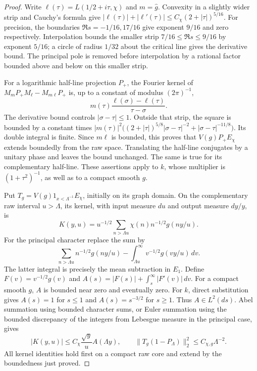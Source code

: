 \begin{proof}
Write $\ell(\tau)=L(1/2+i\tau,\chi)$ and $m=\widehat g$.
Convexity in a slightly wider strip and Cauchy's formula give
$|\ell(\tau)|+|\ell'(\tau)|\leq C_\chi(2+|\tau|)^{5/16}$.
For precision, the boundaries $\Re s=-1/16,17/16$ give exponent
$9/16$ and zero respectively. Interpolation bounds the smaller
strip $7/16\leq\Re s\leq9/16$ by exponent $5/16$; a circle of
radius $1/32$ about the critical line gives the derivative bound.
The principal pole is removed before interpolation by a rational
factor bounded above and below on this smaller strip.

For a logarithmic half-line projection $P_+$, the Fourier kernel of
$M_mP_+M_\ell-M_{m\ell}P_+$ is, up to a constant of modulus
$(2\pi)^{-1}$,
\[
 m(\tau)\frac{\ell(\sigma)-\ell(\tau)}{\tau-\sigma}.
\]
The derivative bound controls $|\sigma-\tau|\leq1$. Outside that
strip, the square is bounded by a constant times
$|m(\tau)|^2\bigl((2+|\tau|)^{5/8}|\sigma-\tau|^{-2}
+|\sigma-\tau|^{-11/8}\bigr)$.
Its double integral is finite. Since $m\ell$ is bounded, this
proves that $V(g)P_+E_\chi$ extends boundedly from the raw space.
Translating the half-line conjugates by a unitary phase and leaves
the bound unchanged. The same is true for its complementary
half-line. These assertions apply to $k$, whose multiplier is
$(1+\tau^2)^{-1}$, as well as to a compact smooth $g$.

Put $T_g=V(g)1_{x<\Lambda^{-1}}E_\chi$, initially on its graph
domain. On the complementary raw interval $u>\Lambda$, its kernel,
with input measure $du$ and output measure $dy/y$, is
\[
 K(y,u)=u^{-1/2}\sum_{n>\Lambda u}\chi(n)n^{-1/2}g(ny/u).
\]
For the principal character replace the sum by
\[
 \sum_{n>\Lambda u}n^{-1/2}g(ny/u)
       -\int_{\Lambda u}^\infty v^{-1/2}g(vy/u)\,dv.
\]
The latter integral is precisely the mean subtraction in $E_1$.
Define $F(v)=v^{-1/2}g(v)$ and
$A(s)=|F(s)|+\int_s^\infty|F'(v)|\,dv$.
For a compact smooth $g$, $A$ is bounded near zero and eventually
zero. For $k$, direct substitution gives $A(s)=1$ for $s\leq1$
and $A(s)=s^{-3/2}$ for $s\geq1$. Thus $A\in L^2(ds)$.
Abel summation using bounded character sums, or Euler summation
using the bounded discrepancy of the integers from Lebesgue
measure in the principal case, gives
\[
 |K(y,u)|\leq C_\chi\frac{\sqrt y}{u}A(\Lambda y),
 \qquad
 \|T_g(1-P_\Lambda)\|_2^2\leq C_{\chi,g}\Lambda^{-2}.
\]
All kernel identities hold first on a compact raw core and extend
by the boundedness just proved.


\end{proof}
